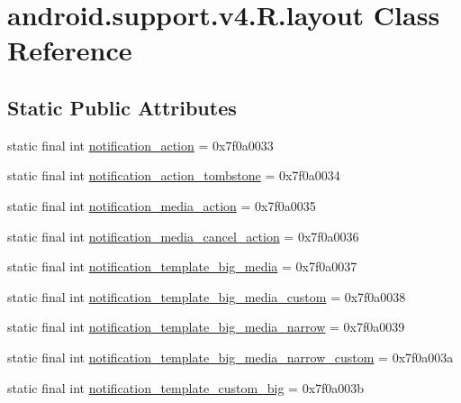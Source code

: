 \hypertarget{classandroid_1_1support_1_1v4_1_1_r_1_1layout}{}\section{android.\+support.\+v4.\+R.\+layout Class Reference}
\label{classandroid_1_1support_1_1v4_1_1_r_1_1layout}
\subsection*{Static Public Attributes}
\begin{DoxyCompactItemize}
\item 
static final int \mbox{\hyperlink{classandroid_1_1support_1_1v4_1_1_r_1_1layout_ac1411f1001043a2b326b906b8ff45fea}{notification\+\_\+action}} = 0x7f0a0033
\item 
static final int \mbox{\hyperlink{classandroid_1_1support_1_1v4_1_1_r_1_1layout_acb294013b8cd2a08ae0dffd96c702fdb}{notification\+\_\+action\+\_\+tombstone}} = 0x7f0a0034
\item 
static final int \mbox{\hyperlink{classandroid_1_1support_1_1v4_1_1_r_1_1layout_aca36a79f5eadb59146515ffed73c3777}{notification\+\_\+media\+\_\+action}} = 0x7f0a0035
\item 
static final int \mbox{\hyperlink{classandroid_1_1support_1_1v4_1_1_r_1_1layout_ae93bfe9691889264f234cdad70289374}{notification\+\_\+media\+\_\+cancel\+\_\+action}} = 0x7f0a0036
\item 
static final int \mbox{\hyperlink{classandroid_1_1support_1_1v4_1_1_r_1_1layout_a4532849f97a2ea66c7969abe576d998d}{notification\+\_\+template\+\_\+big\+\_\+media}} = 0x7f0a0037
\item 
static final int \mbox{\hyperlink{classandroid_1_1support_1_1v4_1_1_r_1_1layout_a26f42a4c35af6add5b7cef3a03008f5f}{notification\+\_\+template\+\_\+big\+\_\+media\+\_\+custom}} = 0x7f0a0038
\item 
static final int \mbox{\hyperlink{classandroid_1_1support_1_1v4_1_1_r_1_1layout_a8ce4e8b413c5345c2d47fc68c465a5ee}{notification\+\_\+template\+\_\+big\+\_\+media\+\_\+narrow}} = 0x7f0a0039
\item 
static final int \mbox{\hyperlink{classandroid_1_1support_1_1v4_1_1_r_1_1layout_a3f1c19efb3b6a1d34c0b4a6e3d8eaab8}{notification\+\_\+template\+\_\+big\+\_\+media\+\_\+narrow\+\_\+custom}} = 0x7f0a003a
\item 
static final int \mbox{\hyperlink{classandroid_1_1support_1_1v4_1_1_r_1_1layout_a67bb31b5622bc564c3af959470bab5b4}{notification\+\_\+template\+\_\+custom\+\_\+big}} = 0x7f0a003b

\end{DoxyCompactItemize}
